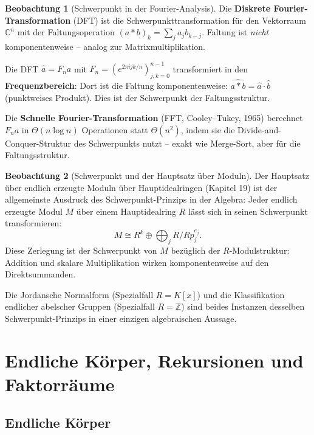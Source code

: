 ﻿\documentclass[a4paper,12pt]{report}
\theoremstyle{definition}
\newtheorem{beobachtung}{Beobachtung}
\begin{document}
\begin{beobachtung}[Schwerpunkt in der Fourier-Analysis]
    Die \textbf{Diskrete Fourier-Trans\-formation} (DFT) ist die
    Schwerpunkttransformation für den Vektorraum $\mathbb{C}^n$ mit
    der Faltungsoperation $(a * b)_k = \sum_j a_j b_{k-j}$.
    Faltung ist \emph{nicht} komponentenweise -- analog zur Matrixmultiplikation.

    Die DFT $\hat{a} = F_n a$ mit $F_n = (e^{2\pi i jk/n})_{j,k=0}^{n-1}$
    transformiert in den \textbf{Frequenzbereich}: Dort ist die Faltung
    komponentenweise: $\widehat{a * b} = \hat{a} \cdot \hat{b}$
    (punktweises Produkt). Dies ist der Schwerpunkt der Faltungsstruktur.

    Die \textbf{Schnelle Fourier-Transformation} (FFT, Cooley--Tukey, 1965)
    berechnet $F_n a$ in $\Theta(n \log n)$ Operationen statt $\Theta(n^2)$,
    indem sie die Divide-and-Conquer-Struktur des Schwerpunkts nutzt --
    exakt wie Merge-Sort, aber für die Faltungsstruktur.
\end{beobachtung}

\begin{beobachtung}[Schwerpunkt und der Hauptsatz über Moduln]
    Der Hauptsatz über endlich erzeugte Moduln über Hauptidealringen
    (Kapitel 19) ist der allgemeinste Ausdruck des Schwerpunkt-Prinzips
    in der Algebra: Jeder endlich erzeugte Modul $M$ über einem
    Hauptidealring $R$ lässt sich in seinen Schwerpunkt transformieren:
    \[
        M \cong R^k \oplus \bigoplus_j R/Rp_j^{e_j}.
    \]
    Diese Zerlegung ist der Schwerpunkt von $M$ bezüglich der
    $R$-Modulstruktur: Addition und skalare Multiplikation wirken
    komponentenweise auf den Direktsummanden.

    Die Jordansche Normalform (Spezialfall $R = K[x]$) und die
    Klassifikation endlicher abelscher Gruppen (Spezialfall $R = \mathbb{Z}$)
    sind beides Instanzen desselben Schwerpunkt-Prinzips in einer
    einzigen algebraischen Aussage.
\end{beobachtung}

\chapter{Endliche Körper, Rekursionen und Faktorräume}

\section{Endliche Körper}
\end{document}
